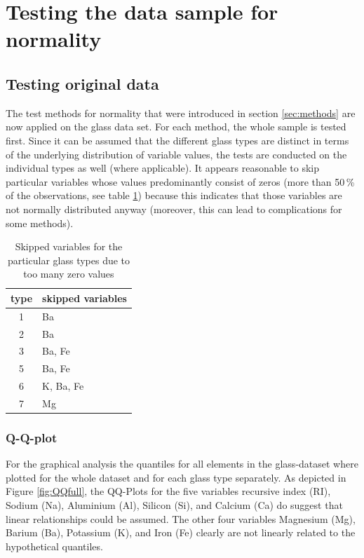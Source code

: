 \documentclass[a4paper, 12pt, titlepage, headsepline, listof = totoc, bibliography = totoc, numbers = noenddot]{scrartcl}
\begin{document}
\vfill


\newpage
\section{Testing the data sample for normality}\label{sec:testing}

\subsection{Testing original data}


The test methods for normality that were introduced in section \ref{sec:methods} are now applied on the glass data set. For each method, the whole sample is tested first. Since it can be assumed that the different glass types are distinct in terms of the underlying distribution of variable values, the tests are conducted on the individual types as well (where applicable). It appears reasonable to skip particular variables whose values predominantly consist of zeros (more than 50\,\% of the observations, see table \ref{tab:zeros}) because this indicates that those variables are not normally distributed anyway (moreover, this can lead to complications for some methods).

\begin{table}[h!]
\centering
\begin{tabular}{|cl|}
\hline
type & skipped variables\\
\hline
1 & Ba\\
2 & Ba\\
3 & Ba, Fe\\
5 & Ba, Fe\\
6 & K, Ba, Fe\\
7 & Mg\\
\hline
\end{tabular}
\caption{Skipped variables for the particular glass types due to too many zero values}
\label{tab:zeros}
\end{table}

\subsubsection{Q-Q-plot}\label{sec:qq-original}
For the graphical analysis the quantiles for all elements in the glass-dataset where plotted for the whole dataset and for each glass type separately. As depicted in Figure \ref{fig:QQfull}, the QQ-Plots for the five variables recursive index (RI), Sodium (Na), Aluminium (Al), Silicon (Si), and Calcium (Ca) do suggest that linear relationships could be assumed. The other four variables Magnesium (Mg), Barium (Ba), Potassium (K), and Iron (Fe) clearly are not linearly related to the hypothetical quantiles.
\end{document}
